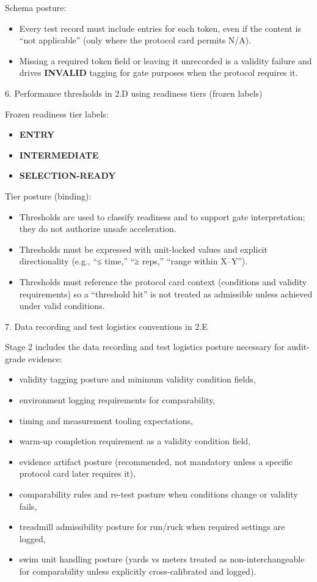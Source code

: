 \documentclass[10pt]{article}
\begin{document}
Schema posture:

\begin{itemize}
\item Every test record must include entries for each token, even if the content is “not applicable” (only where the protocol card permits N/A).
\item Missing a required token field or leaving it unrecorded is a validity failure and drives \textbf{INVALID} tagging for gate purposes when the protocol requires it.
\end{itemize}

6. Performance thresholds in 2.D using readiness tiers (frozen labels)

Frozen readiness tier labels:

\begin{itemize}
\item \textbf{ENTRY}
\item \textbf{INTERMEDIATE}
\item \textbf{SELECTION-READY}
\end{itemize}

Tier posture (binding):

\begin{itemize}
\item Thresholds are used to classify readiness and to support gate interpretation; they do not authorize unsafe acceleration.
\item Thresholds must be expressed with unit-locked values and explicit directionality (e.g., “≤ time,” “≥ reps,” “range within X–Y”).
\item Thresholds must reference the protocol card context (conditions and validity requirements) so a “threshold hit” is not treated as admissible unless achieved under valid conditions.
\end{itemize}

7. Data recording and test logistics conventions in 2.E

Stage 2 includes the data recording and test logistics posture necessary for audit-grade evidence:

\begin{itemize}
\item validity tagging posture and minimum validity condition fields,
\item environment logging requirements for comparability,
\item timing and measurement tooling expectations,
\item warm-up completion requirement as a validity condition field,
\item evidence artifact posture (recommended, not mandatory unless a specific protocol card later requires it),
\item comparability rules and re-test posture when conditions change or validity fails,
\item treadmill admissibility posture for run/ruck when required settings are logged,
\item swim unit handling posture (yards vs meters treated as non-interchangeable for comparability unless explicitly cross-calibrated and logged).
\end{itemize}
\end{document}
